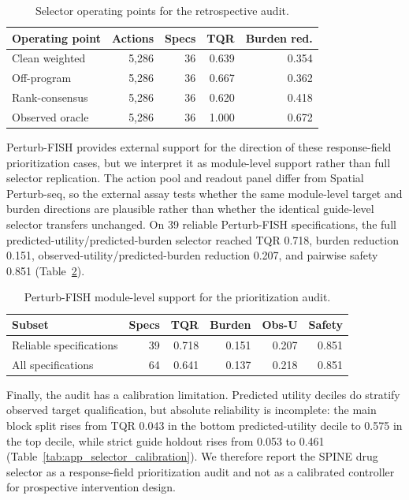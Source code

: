 \documentclass[sigconf,review,balance=false]{acmart}
\begin{document}
\begin{table}[t]
\centering
\small
\caption{Selector operating points for the retrospective audit.}
\label{tab:app_selector_operating_points}
\setlength{\tabcolsep}{4pt}
\begin{tabular}{@{}lrrrr@{}}
\toprule
Operating point & Actions & Specs & TQR & Burden red. \\
\midrule
Clean weighted & 5,286 & 36 & 0.639 & 0.354 \\
Off-program & 5,286 & 36 & 0.667 & 0.362 \\
Rank-consensus & 5,286 & 36 & 0.620 & 0.418 \\
Observed oracle & 5,286 & 36 & 1.000 & 0.672 \\
\bottomrule
\end{tabular}
\end{table}

Perturb-FISH provides external support for the direction of these response-field prioritization cases, but we interpret it as module-level support rather than full selector replication. The action pool and readout panel differ from Spatial Perturb-seq, so the external assay tests whether the same module-level target and burden directions are plausible rather than whether the identical guide-level selector transfers unchanged. On 39 reliable Perturb-FISH specifications, the full predicted-utility/predicted-burden selector reached TQR 0.718, burden reduction 0.151, observed-utility/predicted-burden reduction 0.207, and pairwise safety 0.851 (Table~\ref{tab:app_selector_perturb_fish}).

\begin{table}[t]
\centering
\scriptsize
\caption{Perturb-FISH module-level support for the prioritization audit.}
\label{tab:app_selector_perturb_fish}
\setlength{\tabcolsep}{3pt}
\begin{tabular}{@{}lrrrrr@{}}
\toprule
Subset & Specs & TQR & Burden & Obs-U & Safety \\
\midrule
Reliable specifications & 39 & 0.718 & 0.151 & 0.207 & 0.851 \\
All specifications & 64 & 0.641 & 0.137 & 0.218 & 0.851 \\
\bottomrule
\end{tabular}
\end{table}

Finally, the audit has a calibration limitation. Predicted utility deciles do stratify observed target qualification, but absolute reliability is incomplete: the main block split rises from TQR 0.043 in the bottom predicted-utility decile to 0.575 in the top decile, while strict guide holdout rises from 0.053 to 0.461 (Table~\ref{tab:app_selector_calibration}). We therefore report the SPINE drug selector as a response-field prioritization audit and not as a calibrated controller for prospective intervention design.
\end{document}

